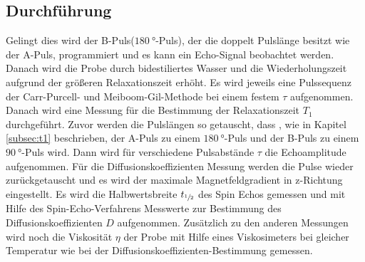 \subsection{Durchführung}
Gelingt dies wird der B-Puls($\SI{180}{\degree}$-Puls),
der die doppelt Pulslänge besitzt wie der A-Puls,
programmiert und es kann ein Echo-Signal beobachtet werden.
Danach wird die Probe durch bidestiliertes Wasser
und die Wiederholungszeit aufgrund der größeren Relaxationszeit
erhöht. Es wird jeweils eine Pulssequenz der Carr-Purcell-
und Meiboom-Gil-Methode bei einem festem $\tau$ aufgenommen.
Danach wird eine Messung für die Bestimmung der Relaxationszeit $T_1$
durchgeführt. Zuvor werden die Pulslängen so getauscht, dass , wie in Kapitel \ref{subsec:t1}
beschrieben, der A-Puls zu einem $\SI{180}{\degree}$-Puls
und der B-Puls zu einem $\SI{90}{\degree}$-Puls wird.
Dann wird für verschiedene Pulsabstände $\tau$ die Echoamplitude aufgenommen.
Für die Diffusionskoeffizienten Messung
werden die Pulse wieder zurückgetauscht
und es wird der maximale Magnetfeldgradient
in z-Richtung eingestellt. Es wird die Halbwertsbreite $t_{\sfrac{1}{2}}$
des Spin Echos gemessen und mit Hilfe
des Spin-Echo-Verfahrens Messwerte zur Bestimmung
des Diffusionskoeffizienten $D$ aufgenommen.
Zusätzlich zu den anderen Messungen
wird noch die Viskosität $\eta$
der Probe mit Hilfe eines Viskosimeters
bei gleicher Temperatur wie bei der
Diffusionskoeffizienten-Bestimmung gemessen.
